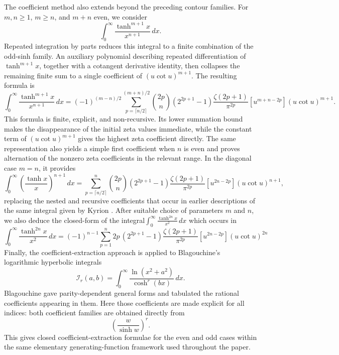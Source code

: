 \documentclass[11pt,twoside]{article}
\numberwithin{equation}{section}
\begin{document}
\vspace{0.1cm}

The coefficient method also extends beyond the preceding contour families.  For
\(m,n\geq1\), \(m\geq n\), and \(m+n\) even, we consider
\[
\int_0^\infty\frac{\tanh^{m+1}x}{x^{n+1}}\,dx.
\]
Repeated integration by parts reduces this integral to a finite combination
of the odd-sinh family.  An auxiliary polynomial describing repeated
differentiation of \(\tanh^{m+1}x\), together with a cotangent derivative
identity, then collapses the remaining finite sum to a single coefficient of
\((u\cot u)^{m+1}\).  The resulting formula is
\[
\int_0^\infty
\frac{\tanh^{m+1}x}{x^{n+1}}\,dx
=
(-1)^{(m-n)/2}
\sum_{p=\lceil n/2\rceil}^{(m+n)/2}
\binom{2p}{n}
(2^{2p+1}-1)
\frac{\zeta(2p+1)}{\pi^{2p}}
[u^{m+n-2p}](u\cot u)^{m+1}.
\]
This formula is finite, explicit, and non-recursive.  Its lower summation bound
makes the disappearance of the initial zeta values immediate, while the
constant term of \((u\cot u)^{m+1}\) gives the highest zeta coefficient
directly.  The same representation also yields a simple first coefficient
when \(n\) is even and proves alternation of the nonzero zeta coefficients in
the relevant range.  In the diagonal case \(m=n\), it provides 
\[
\int_0^\infty
\left(\frac{\tanh x}{x}\right)^{n+1}\,dx
=
\sum_{p=\lceil n/2\rceil}^{n}
\binom{2p}{n}
(2^{2p+1}-1)
\frac{\zeta(2p+1)}{\pi^{2p}}
[u^{2n-2p}](u\cot u)^{n+1},
\]
replacing the nested and recursive coefficients that
occur in earlier descriptions of the same integral given by Kyrion
\cite{Kyrion2025}.
\vspace{0.1cm}
After suitable choice of parameters $m$ and $n$, we also deduce the closed-form of the integral$\displaystyle\int_0^\infty
\frac{\tanh^{2n}x}{x^2}\,dx$ which occurs in \cite{TallaWaffo2025arxiv2511.02843}
\[
\int_0^\infty
\frac{\tanh^{2n}x}{x^2}\,dx
=
(-1)^{n-1}
\sum_{p=1}^{n}
2p\,(2^{2p+1}-1)
\frac{\zeta(2p+1)}{\pi^{2p}}
[u^{2n-2p}](u\cot u)^{2n}
\]
Finally, the coefficient-extraction approach is applied to Blagouchine's
logarithmic hyperbolic integrals
\[
\mathcal I_r(a,b)
=
\int_0^\infty
\frac{\ln(x^2+a^2)}{\cosh^r(bx)}\,dx.
\]
Blagouchine \cite{Blagouchine2014} gave parity-dependent general forms and
tabulated the rational coefficients appearing in them.  Here those
coefficients are made explicit for all indices: both coefficient families are
obtained directly from
\[
\left(\frac{w}{\sinh w}\right)^r.
\]
This gives closed coefficient-extraction formulae for the even and odd cases
within the same elementary generating-function framework used throughout the
paper.
\end{document}
